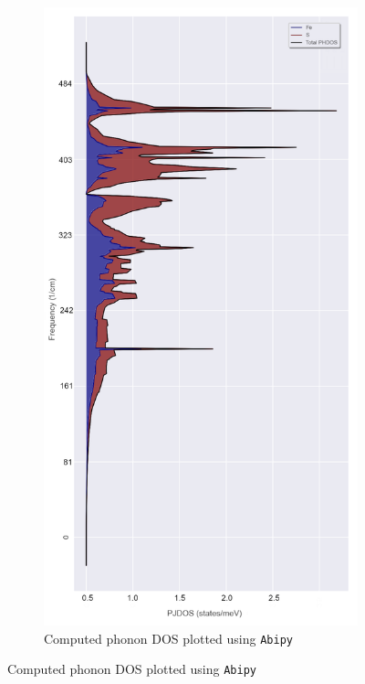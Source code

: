 \documentclass[11pt,a4paper]{article}
\begin{document}
\begin{figure}
\centering
\begin{subfigure}[b]{0.54\textwidth}
\centering
\includegraphics[width=\textwidth]{images/dos}
\caption{Computed phonon DOS plotted using \texttt{Abipy}}
\label{fig:phonondos1}
\end{subfigure}

\end{figure}
\end{document}
